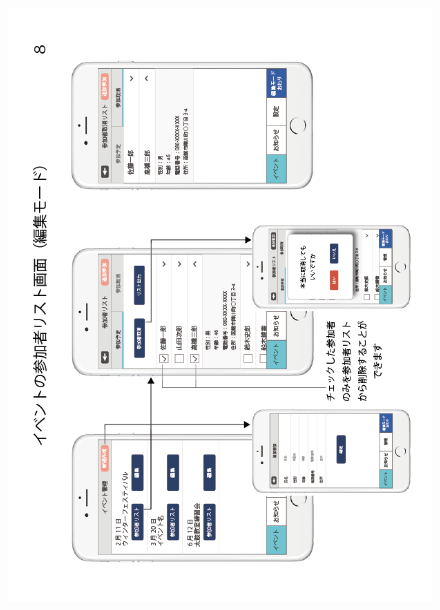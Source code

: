 \begin{figure}[ht]
    \begin{center}
    \includegraphics[keepaspectratio, scale=0.7]{appendixs/appendixB_figres/fig8.png}
    \end{center}
\end{figure}

